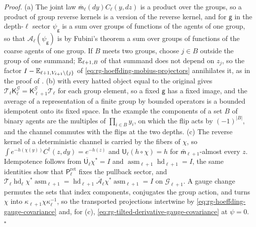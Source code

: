 \noindent\emph{Proof.}
(a) The joint law $\bar{\mathsf m}_\ell(dy)C_\ell(y,dz)$ is a product over the
groups, so a product of group reverse kernels is a version of the reverse kernel,
and for $\mathsf g$ in the depth-$\ell$ sector $\psi_{\mathsf g}$ is a sum over
groups of functions of the agents of one group, so that $\mathcal A_\ell(\psi_{\mathsf
g})$ is by Fubini's theorem a sum over groups of functions of the coarse agents of
one group. If $B$ meets two groups, choose $j\in B$ outside the group of one summand;
$\mathbb E_{\ell+1,B}$ of that summand does not depend on $z_j$, so the factor
$I-\mathbb E_{\ell+1,V_{\ell+1}\setminus\{j\}}$ of \eqref{eq:rg-hoeffding-mobius-projectors}
annihilates it, as in the proof of .
(b)  with every hatted object equal to
the original gives $\mathcal T_\ell\mathsf K^{\mathcal G}_\ell=\mathsf K^{\mathcal
G}_{\ell+1}\mathcal T_\ell$ for each group element, so a fixed $\mathsf g$ has a
fixed image, and the average of a representation of a finite group by bounded
operators is a bounded idempotent onto its fixed space. In the example the
components of a set $B$ of binary agents are the multiples of $\prod_{i\in B}y_i$,
on which the flip acts by $(-1)^{\lvert B\rvert}$, and the channel commutes with the
flips at the two depths. (c) The reverse kernel of a deterministic channel is
carried by the fibers of $\chi$, so $\int e^{-h(\chi(y))}C^\dagger(z,dy)=e^{-h(z)}$
and $\mathsf U_\ell(h\circ\chi)=h$ for $\bar{\mathsf m}_{\ell+1}$-almost every $z$.
Idempotence follows from $\overline{\mathsf U_\ell}\chi^*=I$ and
$\operatorname{asm}_{\ell+1}\operatorname{hd}_{\ell+1}=I$, the same identities show
that $\mathsf P^{\mathrm{ret}}_\ell$ fixes the pullback sector, and
$\mathcal T_\ell\operatorname{hd}_\ell\chi^*\operatorname{asm}_{\ell+1}
=\operatorname{hd}_{\ell+1}\overline{\mathcal A}_\ell\chi^*\operatorname{asm}_{\ell+1}=I$
on $\mathcal G_{\ell+1}$. A gauge change permutes the sets that index components,
conjugates the group action, and turns $\chi$ into
$\kappa_{\ell+1}\chi\kappa_\ell^{-1}$, so the transported projections intertwine by
\eqref{eq:rg-hoeffding-gauge-covariance} and, for (c),
\eqref{eq:rg-tilted-derivative-gauge-covariance} at $\psi=0$. $\square$

